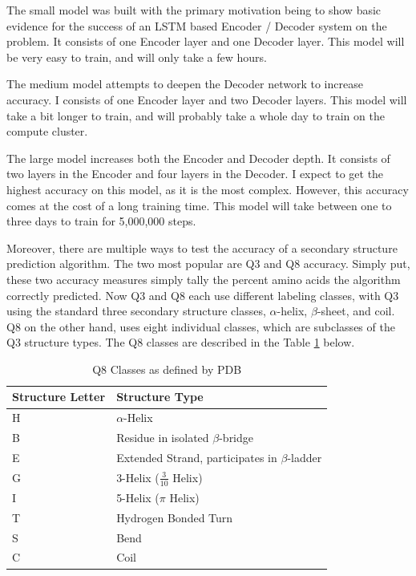 \documentclass[pageno]{jpaper}
\begin{document}
\par
The small model was built with the primary motivation being to show basic evidence for the success of an LSTM based Encoder / Decoder system on the problem.  It consists of one Encoder layer and one Decoder layer.  This model will be very easy to train, and will only take a few hours.

\par
The medium model attempts to deepen the Decoder network to increase accuracy.  I consists of one Encoder layer and two Decoder layers.  This model will take a bit longer to train, and will probably take a whole day to train on the compute cluster. 

\par
The large model increases both the Encoder and Decoder depth.  It consists of two layers in the Encoder and four layers in the Decoder.  I expect to get the highest accuracy on this model, as it is the most complex.  However, this accuracy comes at the cost of a long training time. This model will take between one to three days to train for 5,000,000 steps.

\par
Moreover, there are multiple ways to test the accuracy of a secondary structure prediction algorithm.  The two most popular are Q3 and Q8 accuracy.  Simply put, these two accuracy measures simply tally the percent amino acids the algorithm correctly predicted.  Now Q3 and Q8 each use different labeling classes, with Q3 using the standard three secondary structure classes, $\alpha$-helix, $\beta$-sheet, and coil.  Q8 on the other hand, uses eight individual classes, which are subclasses of the Q3 structure types.  The Q8 classes are described in the Table \ref{tb:q8} below.

\begin{table}[H]
	\centering
	\caption{Q8 Classes as defined by PDB \cite{berman:2000}}
	\label{tb:q8}
	\begin{tabular}{|l|l|}
		\hline
		\textbf{Structure Letter} & \textbf{Structure Type}                               \\ \hline
		H                & $\alpha$-Helix                               \\ \hline
		B                & Residue in isolated $\beta$-bridge           \\ \hline
		E                & Extended Strand, participates in $\beta$-ladder \\ \hline
		G                & 3-Helix ($\frac{3}{10}$ Helix)               \\ \hline
		I                & 5-Helix ($\pi$ Helix)                        \\ \hline
		T                & Hydrogen Bonded Turn                         \\ \hline
		S                & Bend                                         \\ \hline
		C                & Coil                                         \\ \hline
	\end{tabular}
\end{table}
\end{document}
